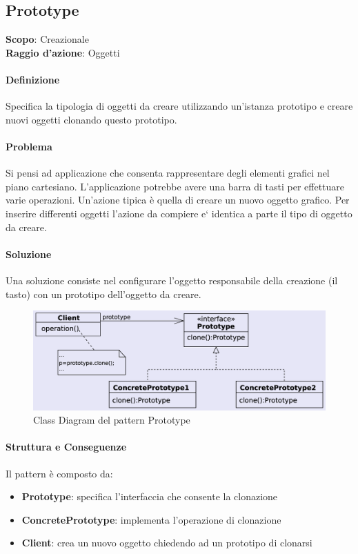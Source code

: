 \subsection{Prototype}
\label{prototype}

\textbf{Scopo}: Creazionale \\
\textbf{Raggio d'azione}: Oggetti

\paragraph{Definizione} Specifica la tipologia di oggetti da creare utilizzando un'istanza prototipo e creare nuovi oggetti clonando questo prototipo.

\paragraph{Problema} Si pensi ad applicazione che consenta rappresentare degli elementi grafici nel piano cartesiano. L’applicazione potrebbe avere una barra di tasti per effettuare varie operazioni. Un’azione tipica è quella di creare un nuovo oggetto grafico. Per inserire differenti oggetti l’azione da compiere e` identica a parte il tipo di oggetto da creare.

\paragraph{Soluzione} Una soluzione consiste nel configurare l’oggetto responsabile della creazione (il tasto) con un prototipo dell’oggetto da creare.

\begin{figure}[H]
    \centering
    \includegraphics[width=0.75\linewidth]{assets/pattern/prototype/prototype-struttura.png}
    \caption{Class Diagram del pattern Prototype}
\end{figure}

\paragraph{Struttura e Conseguenze} Il pattern è composto da:
\begin{itemize}
    \item \textbf{Prototype}: specifica l'interfaccia che consente la clonazione
    \item \textbf{ConcretePrototype}: implementa l'operazione di clonazione
    \item \textbf{Client}: crea un nuovo oggetto chiedendo ad un prototipo di clonarsi
\end{itemize}

